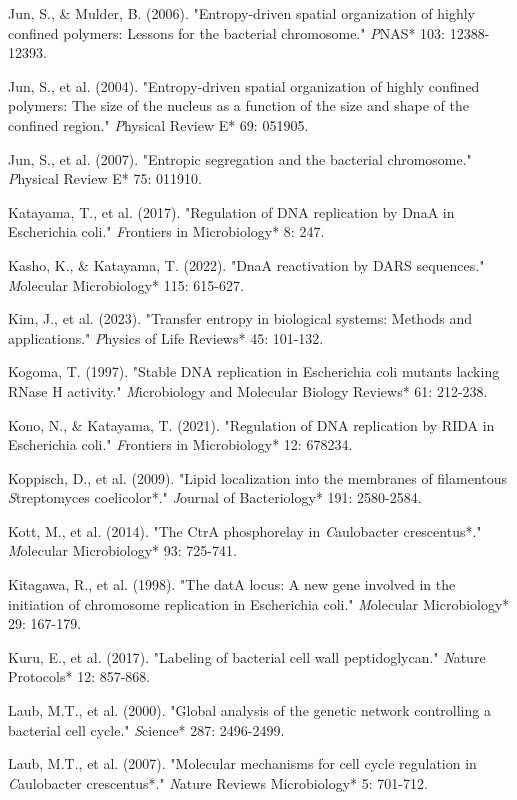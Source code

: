 \documentclass[11pt,a4paper]{article}
\begin{document}
Jun, S., & Mulder, B. (2006). "Entropy-driven spatial organization of highly confined polymers: Lessons for the bacterial chromosome." \textit*PNAS* 103: 12388-12393.

Jun, S., et al. (2004). "Entropy-driven spatial organization of highly confined polymers: The size of the nucleus as a function of the size and shape of the confined region." \textit*Physical Review E* 69: 051905.

Jun, S., et al. (2007). "Entropic segregation and the bacterial chromosome." \textit*Physical Review E* 75: 011910.

Katayama, T., et al. (2017). "Regulation of DNA replication by DnaA in Escherichia coli." \textit*Frontiers in Microbiology* 8: 247.

Kasho, K., & Katayama, T. (2022). "DnaA reactivation by DARS sequences." \textit*Molecular Microbiology* 115: 615-627.

Kim, J., et al. (2023). "Transfer entropy in biological systems: Methods and applications." \textit*Physics of Life Reviews* 45: 101-132.

Kogoma, T. (1997). "Stable DNA replication in Escherichia coli mutants lacking RNase H activity." \textit*Microbiology and Molecular Biology Reviews* 61: 212-238.

Kono, N., & Katayama, T. (2021). "Regulation of DNA replication by RIDA in Escherichia coli." \textit*Frontiers in Microbiology* 12: 678234.

Koppisch, D., et al. (2009). "Lipid localization into the membranes of filamentous \textit*Streptomyces coelicolor*." \textit*Journal of Bacteriology* 191: 2580-2584.

Kott, M., et al. (2014). "The CtrA phosphorelay in \textit*Caulobacter crescentus*." \textit*Molecular Microbiology* 93: 725-741.

Kitagawa, R., et al. (1998). "The datA locus: A new gene involved in the initiation of chromosome replication in Escherichia coli." \textit*Molecular Microbiology* 29: 167-179.

Kuru, E., et al. (2017). "Labeling of bacterial cell wall peptidoglycan." \textit*Nature Protocols* 12: 857-868.

Laub, M.T., et al. (2000). "Global analysis of the genetic network controlling a bacterial cell cycle." \textit*Science* 287: 2496-2499.

Laub, M.T., et al. (2007). "Molecular mechanisms for cell cycle regulation in \textit*Caulobacter crescentus*." \textit*Nature Reviews Microbiology* 5: 701-712.
\end{document}
